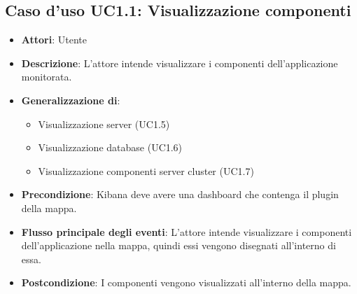 \subsection{Caso d'uso UC1.1: Visualizzazione componenti}
\begin{itemize}
	\item \textbf{Attori}: Utente
	\item \textbf{Descrizione}: L'attore intende visualizzare i componenti dell'applicazione monitorata.
	\item 	\textbf{Generalizzazione di}:
	\begin{itemize}
		\item Visualizzazione server (UC1.5)
		\item Visualizzazione database (UC1.6)
		\item Visualizzazione componenti server cluster (UC1.7)
	\end{itemize}
	\item \textbf{Precondizione}: Kibana deve avere una dashboard che contenga il plugin della mappa.
	\item \textbf{Flusso principale degli eventi}: L'attore intende visualizzare i componenti dell'applicazione nella mappa, quindi essi vengono disegnati all'interno di essa.
	\item \textbf{Postcondizione}: I componenti vengono visualizzati all'interno della mappa.
\end{itemize}
